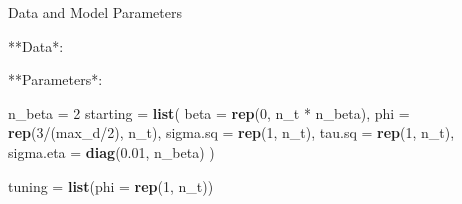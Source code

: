 \documentclass[11pt,ignorenonframetext,]{beamer}
\newenvironment{Shaded}{}{}
\newcommand{\KeywordTok}[1]{\textcolor[rgb]{0.00,0.44,0.13}{\textbf{#1}}}
\newcommand{\DataTypeTok}[1]{\textcolor[rgb]{0.56,0.13,0.00}{#1}}
\newcommand{\DecValTok}[1]{\textcolor[rgb]{0.25,0.63,0.44}{#1}}
\newcommand{\FloatTok}[1]{\textcolor[rgb]{0.25,0.63,0.44}{#1}}
\newcommand{\StringTok}[1]{\textcolor[rgb]{0.25,0.44,0.63}{#1}}
\newcommand{\OperatorTok}[1]{\textcolor[rgb]{0.40,0.40,0.40}{#1}}
\newcommand{\NormalTok}[1]{#1}
\let\oldShaded\Shaded
\let\endoldShaded\endShaded
\renewenvironment{Shaded}{\footnotesize\begin{spacing}{0.9}\oldShaded}{\endoldShaded\end{spacing}}
\let\oldverbatim\verbatim
\let\endoldverbatim\endverbatim
\newcommand{\scriptoutput}{
  \renewenvironment{Shaded}{\scriptsize\begin{spacing}{0.9}\oldShaded}{\endoldShaded\end{spacing}}
  \renewenvironment{verbatim}{\scriptsize\begin{spacing}{0.9}\oldverbatim}{\endoldverbatim\end{spacing}}
}
\begin{document}
\begin{frame}[fragile]{Data and Model Parameters}

**Data*: \scriptoutput

\begin{Shaded}
\end{Shaded}

**Parameters*: \scriptoutput

\begin{Shaded}
\begin{Highlighting}[]
\NormalTok{n_beta =}\StringTok{ }\DecValTok{2}
\NormalTok{starting =}\StringTok{ }\KeywordTok{list}\NormalTok{(}
  \DataTypeTok{beta =} \KeywordTok{rep}\NormalTok{(}\DecValTok{0}\NormalTok{, n_t }\OperatorTok{*}\StringTok{ }\NormalTok{n_beta), }\DataTypeTok{phi =} \KeywordTok{rep}\NormalTok{(}\DecValTok{3}\OperatorTok{/}\NormalTok{(max_d}\OperatorTok{/}\DecValTok{2}\NormalTok{), n_t),}
  \DataTypeTok{sigma.sq =} \KeywordTok{rep}\NormalTok{(}\DecValTok{1}\NormalTok{, n_t), }\DataTypeTok{tau.sq =} \KeywordTok{rep}\NormalTok{(}\DecValTok{1}\NormalTok{, n_t), }
  \DataTypeTok{sigma.eta =} \KeywordTok{diag}\NormalTok{(}\FloatTok{0.01}\NormalTok{, n_beta)}
\NormalTok{)}

\NormalTok{tuning =}\StringTok{ }\KeywordTok{list}\NormalTok{(}\DataTypeTok{phi =} \KeywordTok{rep}\NormalTok{(}\DecValTok{1}\NormalTok{, n_t))}


\end{Highlighting}
\end{Shaded}
\end{frame}
\end{document}
